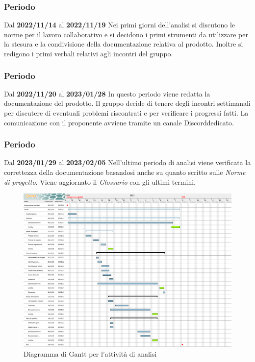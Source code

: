 \subsubsection{ Periodo}
Dal \textbf{2022/11/14} al \textbf{2022/11/19}
\newline
Nei primi giorni dell'analisi si discutono le norme per il lavoro collaborativo e si decidono i primi strumenti da utilizzare per
la stesura e la condivisione della documentazione relativa al prodotto. Inoltre si redigono i primi verbali relativi agli incontri
del gruppo.

\subsubsection{ Periodo} 
Dal \textbf{2022/11/20} al \textbf{2023/01/28}
\newline
In questo periodo viene redatta la documentazione del prodotto. Il gruppo decide di tenere degli incontri settimanali per discutere di
eventuali problemi riscontrati e per verificare i progressi fatti. La comunicazione con il proponente avviene tramite un canale 
Discord\glo  dedicato.

\subsubsection{ Periodo} 
Dal \textbf{2023/01/29} al \textbf{2023/02/05}
\newline
Nell'ultimo periodo di analisi viene verificata la correttezza della documentazione basandosi anche su quanto scritto 
sulle \textit{Norme di progetto}. Viene aggiornato il \textit{Glossario} con gli ultimi termini.

\begin{figure}[H]
    \centering
    \includegraphics[scale=0.3]{src/img/Gantt analisi.png}
    \caption{Diagramma di Gantt per l'attività di analisi}
\end{figure}


